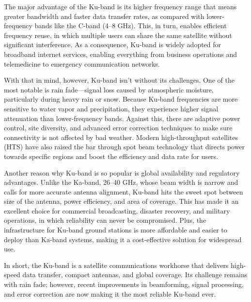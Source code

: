 \documentclass[12pt]{article}
\begin{document}
\par The major advantage of the Ku-band is its higher frequency range that means greater bandwidth and faster data transfer rates, as compared with lower-frequency bands like the C-band (4–8 GHz). This, in turn, enables efficient frequency reuse, in which multiple users can share the same satellite without significant interference. As a consequence, Ku-band is widely adopted for broadband internet services, enabling everything from business operations and telemedicine to emergency communication networks.\\

\par With that in mind, however, Ku-band isn't without its challenges. One of the most notable is rain fade—signal loss caused by atmospheric moisture, particularly during heavy rain or snow. Because Ku-band frequencies are more sensitive to water vapor and precipitation, they experience higher signal attenuation than lower-frequency bands. Against this, there are adaptive power control, site diversity, and advanced error correction techniques to make sure connectivity is not affected by bad weather. Modern high-throughput satellites (HTS) have also raised the bar through spot beam technology that directs power towards specific regions and boost the efficiency and data rate for users.\\

\par Another reason why Ku-band is so popular is global availability and regulatory advantages. Unlike the Ka-band, 26–40 GHz, whose beam width is narrow and calls for more accurate antenna alignment, Ku-band hits the sweet spot between size of the antenna, power efficiency, and area of coverage. This has made it an excellent choice for commercial broadcasting, disaster recovery, and military operations, in which reliability can never be compromised. Plus, the infrastructure for Ku-band ground stations is more affordable and easier to deploy than Ka-band systems, making it a cost-effective solution for widespread use.\\

\par In short, the Ku-band is a satellite communications workhorse that delivers high-speed data transfer, compact antennas, and global coverage. Its challenge remains with rain fade; however, recent improvements in beamforming, signal processing, and error correction are now making it the most reliable Ku-band ever.\\
\end{document}

